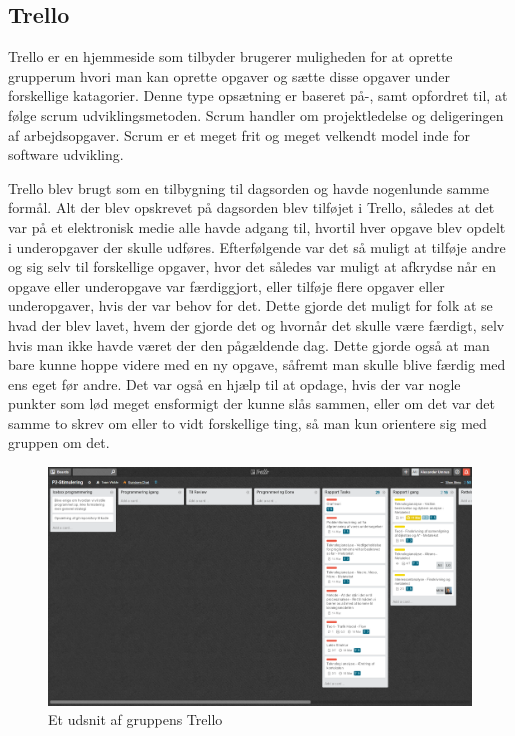 \subsection{Trello}\label{Trello}
Trello er en hjemmeside som tilbyder brugerer muligheden for at oprette grupperum hvori man kan oprette opgaver og sætte disse opgaver under forskellige katagorier. Denne type opsætning er baseret på-, samt opfordret til, at følge scrum udviklingsmetoden. Scrum handler om projektledelse og deligeringen af arbejdsopgaver. Scrum er et meget frit og meget velkendt model inde for software udvikling.

Trello blev brugt som en tilbygning til dagsorden og havde nogenlunde samme formål. Alt der blev opskrevet på dagsorden blev tilføjet i Trello, således at det var på et elektronisk medie alle havde adgang til, hvortil hver opgave blev opdelt i underopgaver der skulle udføres. Efterfølgende var det så muligt at tilføje andre og sig selv til forskellige opgaver, hvor det således var muligt at afkrydse når en opgave eller underopgave var færdiggjort, eller tilføje flere  opgaver eller underopgaver, hvis der var behov for det. Dette gjorde det muligt for folk at se hvad der blev lavet, hvem der gjorde det og hvornår det skulle være færdigt, selv hvis man ikke havde været der den pågældende dag. Dette gjorde også at man bare kunne hoppe videre med en ny opgave, såfremt man skulle blive færdig med ens eget før andre. Det var også en hjælp til at opdage, hvis der var nogle punkter som lød meget ensformigt der kunne slås sammen, eller om det var det samme to skrev om eller to vidt forskellige ting, så man kun orientere sig med gruppen om det. 

\begin{figure}[h]
\includegraphics[scale=0.25]{figures/Trello1}
\centering
\caption{Et udsnit af gruppens Trello}\label{Trello}
\end{figure}

